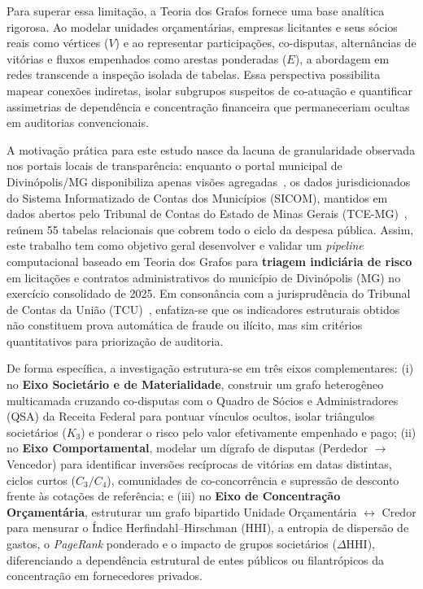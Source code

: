 Para superar essa limitação, a Teoria dos Grafos fornece uma base analítica rigorosa. Ao modelar unidades orçamentárias, empresas licitantes e seus sócios reais como vértices ($V$) e ao representar participações, co-disputas, alternâncias de vitórias e fluxos empenhados como arestas ponderadas ($E$), a abordagem em redes transcende a inspeção isolada de tabelas. Essa perspectiva possibilita mapear conexões indiretas, isolar subgrupos suspeitos de co-atuação e quantificar assimetrias de dependência e concentração financeira que permaneceriam ocultas em auditorias convencionais.

A motivação prática para este estudo nasce da lacuna de granularidade observada nos portais locais de transparência: enquanto o portal municipal de Divinópolis/MG disponibiliza apenas visões agregadas~\cite{portal_transparencia_betha}, os dados jurisdicionados do Sistema Informatizado de Contas dos Municípios (SICOM), mantidos em dados abertos pelo Tribunal de Contas do Estado de Minas Gerais (TCE-MG)~\cite{tce_mg_dados_abertos,tcemg2025in01}, reúnem 55 tabelas relacionais que cobrem todo o ciclo da despesa pública. Assim, este trabalho tem como objetivo geral desenvolver e validar um \textit{pipeline} computacional baseado em Teoria dos Grafos para \textbf{triagem indiciária de risco} em licitações e contratos administrativos do município de Divinópolis (MG) no exercício consolidado de 2025. Em consonância com a jurisprudência do Tribunal de Contas da União (TCU)~\cite{tcu2011acordao2341,tcu2024acordao1798}, enfatiza-se que os indicadores estruturais obtidos não constituem prova automática de fraude ou ilícito, mas sim critérios quantitativos para priorização de auditoria.

De forma específica, a investigação estrutura-se em três eixos complementares: (i) no \textbf{Eixo Societário e de Materialidade}, construir um grafo heterogêneo multicamada cruzando co-disputas com o Quadro de Sócios e Administradores (QSA) da Receita Federal para pontuar vínculos ocultos, isolar triângulos societários ($K_3$) e ponderar o risco pelo valor efetivamente empenhado e pago; (ii) no \textbf{Eixo Comportamental}, modelar um dígrafo de disputas (Perdedor $\to$ Vencedor) para identificar inversões recíprocas de vitórias em datas distintas, ciclos curtos ($C_3/C_4$), comunidades de co-concorrência e supressão de desconto frente às cotações de referência; e (iii) no \textbf{Eixo de Concentração Orçamentária}, estruturar um grafo bipartido Unidade Orçamentária $\leftrightarrow$ Credor para mensurar o Índice Herfindahl--Hirschman (HHI), a entropia de dispersão de gastos, o \textit{PageRank} ponderado e o impacto de grupos societários ($\Delta\text{HHI}$), diferenciando a dependência estrutural de entes públicos ou filantrópicos da concentração em fornecedores privados.

